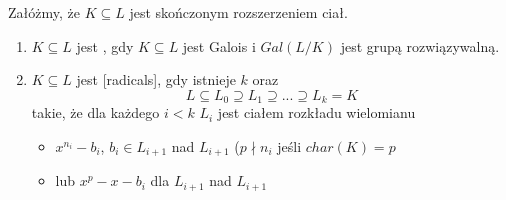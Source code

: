 \begin{bbox}
Załóżmy, że $K\subseteq L$ jest skończonym rozszerzeniem ciał.
\begin{enumerate}[leftmargin=*]
    \item $K\subseteq L$ jest , gdy $K\subseteq L$ jest Galois i $Gal(L/K)$ jest grupą rozwiązywalną.
    \item $K\subseteq L$ jest  [radicals], gdy istnieje $k$ oraz 
    $$L\subseteq L_0\supseteq L_1\supseteq...\supseteq L_k=K$$
    takie, że dla każdego $i<k$ $L_i$ jest ciałem rozkładu wielomianu 
    \begin{itemize}
        \item $x^{n_i}-b_i$, $b_i\in L_{i+1}$ nad $L_{i+1}$ ($p\nmid n_i$ jeśli $char(K)=p$  
        \item lub $x^p-x-b_i$ dla $L_{i+1}$ nad $L_{i+1}$
    \end{itemize}
\end{enumerate}
\end{bbox}

